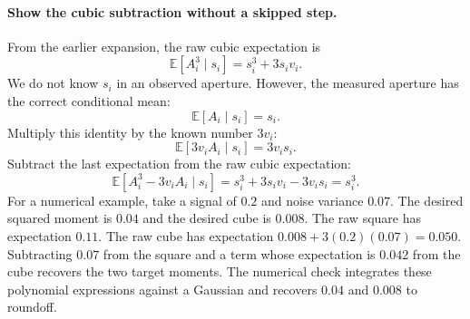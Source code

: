 \documentclass[11pt]{article}
\newcommand{\E}{\mathbb E}
\begin{document}
\paragraph{Show the cubic subtraction without a skipped step.}
From the earlier expansion, the raw cubic expectation is
\begin{equation}
 \E[A_i^3\mid s_i]=s_i^3+3s_i v_i.
\end{equation}
We do not know $s_i$ in an observed aperture. However, the measured aperture
has the correct conditional mean:
\begin{equation}
 \E[A_i\mid s_i]=s_i.
\end{equation}
Multiply this identity by the known number $3v_i$:
\begin{equation}
 \E[3v_iA_i\mid s_i]=3v_i s_i.
\end{equation}
Subtract the last expectation from the raw cubic expectation:
\begin{equation}
 \E[A_i^3-3v_iA_i\mid s_i]
 =s_i^3+3s_i v_i-3v_i s_i=s_i^3.
\end{equation}
For a numerical example, take a signal of $0.2$ and noise variance $0.07$.
The desired squared moment is $0.04$ and the desired cube is $0.008$.
The raw square has expectation $0.11$. The raw cube has expectation
$0.008+3(0.2)(0.07)=0.050$. Subtracting $0.07$ from the square and a
term whose expectation is $0.042$ from the cube recovers the two target
moments. The numerical check integrates these polynomial expressions
against a Gaussian and recovers $0.04$ and $0.008$ to roundoff.
\end{document}
